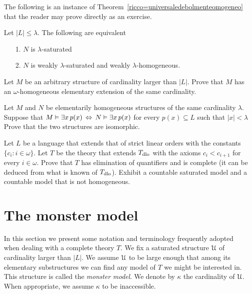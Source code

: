 The following is an instance of Theorem~\ref{ricco=universaledebolmenteomogeneo} that the reader may prove directly as an exercise.

\begin{corollary}\label{saturo=universaledebolmenteomogeneo}
Let $|L|\le\lambda$. The following are equivalent\nobreak
\begin{itemize}
\item[1.] $N$ is $\lambda\mbox{-}$saturated
\item[2.] $N$ is weakly $\lambda\mbox{-}$saturated and weakly $\lambda\mbox{-}$homogeneous.
\end{itemize}
\end{corollary}

\begin{exercise}\label{ex_omega_homogeneous_same_card}
Let $M$ be an arbitrary structure of cardinality larger than $|L|$.
Prove that $M$ has an $\omega\mbox{-}$homogeneous elementary extension of the same cardinality. 
\end{exercise}

\begin{exercise}
  Let $M$ and $N$ be elementarily homogeneous structures of the same cardinality $\lambda$. 
  Suppose that $M\vDash\exists x\, p(x)\,\Leftrightarrow\,N\vDash\exists x\, p(x)$ for every $p(x)\subseteq L$ such that $|x|<\lambda$
  Prove that the two structures are isomorphic. 
\end{exercise}

\begin{exercise}\label{vaughtesempio}
  Let $L$ be a language that extends that of strict linear orders with the constants $\{c_i: i\in\omega\}$.
  Let $T$ be the theory that extends $T_{\rm dlo}$ with the axioms $c_i<c_{i+1}$ for every  $i\in\omega$. Prove that $T$ has elimination of quantifiers and is complete (it can be deduced from what is known of $T_{\rm dlo}$). 
  Exhibit a countable saturated model and a countable model that is not homogeneous. 
\end{exercise}

\section{The monster model}\label{monster}
\label{compattezzasaturazione}

In this section we present some notation and terminology frequently adopted when dealing with a complete theory $T$.
We fix a saturated structure $\EuScript U$ of cardinality larger than $|L|$.
We assume $\EuScript U$ to be large enough that among its elementary substructures we can find any model of $T$ we might be interested in.
This structure is called the \emph{monster model}.
We denote by $\kappa$ the cardinality of $\EuScript U$.
When appropriate, we assume $\kappa$ to be inaccessible. 

